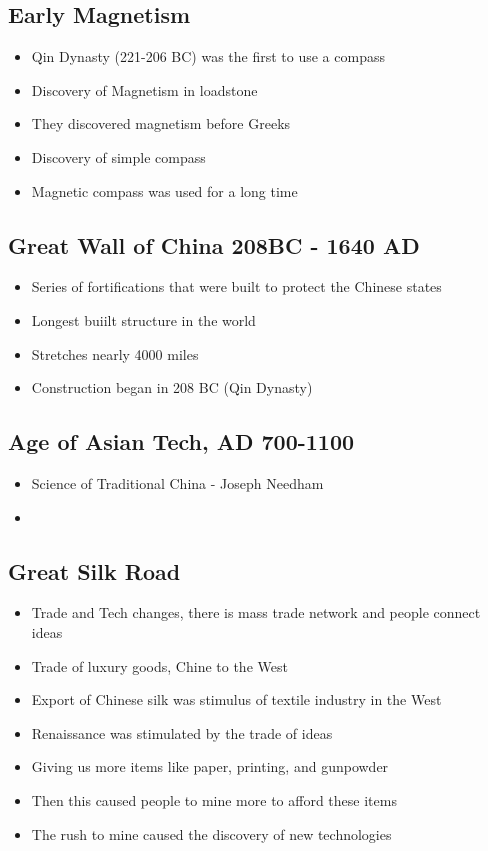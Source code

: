 \documentclass{article}
\begin{document}
\subsection{Early Magnetism}
\begin{itemize}
  \item Qin Dynasty (221-206 BC) was the first to use a compass
  \item Discovery of Magnetism in loadstone
  \item They discovered magnetism before Greeks
  \item Discovery of simple compass
  \item Magnetic compass was used for a long time
\end{itemize}

\subsection{Great Wall of China 208BC - 1640 AD}
\begin{itemize}
  \item Series of fortifications that were built to protect the Chinese states
  \item Longest buiilt structure in the world
  \item Stretches nearly 4000 miles
  \item Construction began in 208 BC (Qin Dynasty)
\end{itemize}

\subsection{Age of Asian Tech, AD 700-1100}
\begin{itemize}
  \item Science of Traditional China - Joseph Needham
  \item
\end{itemize}

\subsection{Great Silk Road}
\begin{itemize}
  \item Trade and Tech changes, there is mass trade
    network and people connect ideas
  \item Trade of luxury goods, Chine to the West
  \item Export of Chinese silk was stimulus of textile industry in the West
  \item Renaissance was stimulated by the trade of ideas
  \item Giving us more items like paper, printing, and gunpowder
  \item Then this caused people to mine more to afford these items
  \item The rush to mine caused the discovery of new technologies
\end{itemize}
\end{document}
